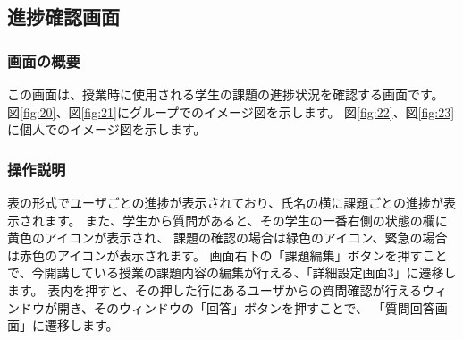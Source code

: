 \newpage

\subsection{進捗確認画面}
\subsubsection{画面の概要}
この画面は、授業時に使用される学生の課題の進捗状況を確認する画面です。
図\ref{fig:20}、図\ref{fig:21}にグループでのイメージ図を示します。
図\ref{fig:22}、図\ref{fig:23}に個人でのイメージ図を示します。

\subsubsection{操作説明}
表の形式でユーザごとの進捗が表示されており、氏名の横に課題ごとの進捗が表示されます。%
また、学生から質問があると、その学生の一番右側の状態の欄に黄色のアイコンが表示され、
課題の確認の場合は緑色のアイコン、緊急の場合は赤色のアイコンが表示されます。
画面右下の「課題編集」ボタンを押すことで、今開講している授業の課題内容の編集が行える、「詳細設定画面3」に遷移します。
表内を押すと、その押した行にあるユーザからの質問確認が行えるウィンドウが開き、そのウィンドウの「回答」ボタンを押すことで、%
「質問回答画面」に遷移します。



